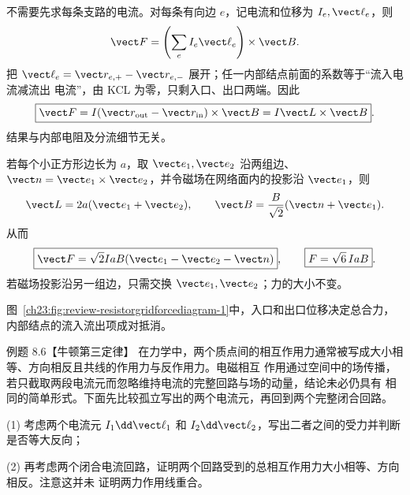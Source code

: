 \begin{xesolution}
不需要先求每条支路的电流。对每条有向边 $e$，记电流和位移为 $I_e,\vect\ell_e$，则
\[
  \vect F=\left(\sum_e I_e\vect\ell_e\right)\times\vect B.
\]
把 $\vect\ell_e=\vect r_{e,+}-\vect r_{e,-}$ 展开；任一内部结点前面的系数等于“流入电流减流出
电流”，由 KCL 为零，只剩入口、出口两端。因此
\begin{equation}
  \boxed{\vect F=I(\vect r_{\rm out}-\vect r_{\rm in})\times\vect B
  =I\vect L\times\vect B}.
\end{equation}
结果与内部电阻及分流细节无关。

若每个小正方形边长为 $a$，取 $\vect e_1,\vect e_2$ 沿两组边、
$\vect n=\vect e_1\times\vect e_2$，并令磁场在网络面内的投影沿 $\vect e_1$，则
\[
  \vect L=2a(\vect e_1+\vect e_2),
  \qquad
  \vect B=\frac{B}{\sqrt2}(\vect n+\vect e_1).
\]
从而
\begin{equation}
  \boxed{\vect F=\sqrt2IaB(\vect e_1-\vect e_2-\vect n)},
  \qquad
  \boxed{F=\sqrt6\,IaB}.
\end{equation}
若磁场投影沿另一组边，只需交换 $\vect e_1,\vect e_2$；力的大小不变。

图~\ref{ch23:fig:review-resistorgridforcediagram-1}中，入口和出口位移决定总合力，内部结点的流入流出项成对抵消。
\par\noindent\begin{minipage}{\linewidth}
\resistorGridForceDiagram
{}\label{ch23:fig:review-resistorgridforcediagram-1}
\end{minipage}\par\medskip
\end{xesolution}

\begin{origexamplebox}{例题 8.6【牛顿第三定律】}
在力学中，两个质点间的相互作用力通常被写成大小相等、方向相反且共线的作用力与反作用力。电磁相互
作用通过空间中的场传播，若只截取两段电流元而忽略维持电流的完整回路与场的动量，结论未必仍具有
相同的简单形式。下面先比较孤立写出的两个电流元，再回到两个完整闭合回路。

(1) 考虑两个电流元 $I_1\dd\vect\ell_1$ 和 $I_2\dd\vect\ell_2$，写出二者之间的受力并判断
是否等大反向；

(2) 再考虑两个闭合电流回路，证明两个回路受到的总相互作用力大小相等、方向相反。注意这并未
证明两力作用线重合。

%
\begin{center}\end{center}
\label{fig:em23-question-6}
\end{origexamplebox}

